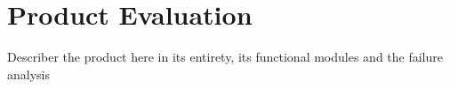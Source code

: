 \chapter{Product Evaluation}
Describer the product here in its entirety, its functional modules and the failure analysis
